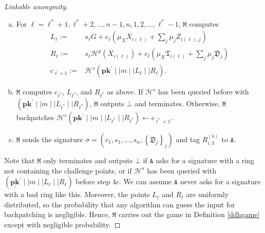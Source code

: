 \documentclass[draft]{llncs} %
\begin{document}
\begin{proof}[Linkable anonymity]
\begin{enumerate}[(a)]
\item For $\ell=\ell^*+1, \ell^*+2, \ldots, n-1, n, 1, 2, \ldots, \ell^*-1$, $\texttt{M}$ computes
\begin{align*}
L_\ell :=& s_\ell G + c_\ell\left(\mu_X X_{i(\ell)} + \sum_j \mu_j Z_{i(\ell),j}\right) \\
R_\ell :=& s_\ell\mathcal{H}^p(X_{i(\ell)}) + c_\ell\left(\mu_X \mathfrak{T}_{i(\ell)} + \sum_j \mu_j \mathfrak{D}_j\right)\\
c_{\ell+1} :=& \mathcal{H}^s\left(\underline{\textbf{pk}}^\prime \mid \mid m \mid \mid L_\ell \mid \mid R_\ell \right).
\end{align*}

\item $\texttt{M}$ computes $c_{\ell^*}$, $L_{\ell^*}$, and $R_{\ell^*}$ as above. If $\mathcal{H}^s$ has been queried before with $\left(\underline{\textbf{pk}}^\prime \mid \mid m \mid \mid L_{\ell^*} \mid \mid R_{\ell^*} \right)$, $\texttt{M}$ outputs $\bot$ and terminates. Otherwise, $\texttt{M}$ backpatches $\mathcal{H}^s\left(\underline{\textbf{pk}}^\prime \mid \mid m \mid \mid L_{\ell^*} \mid \mid R_{\ell^*} \right) \leftarrow c_{\ell^*+1}$.

\item $\texttt{M}$ sends the signature $\sigma = (c_1, s_1, \ldots, s_n, \left\{\mathfrak{D}_j\right\}_j)$ and tag $R_{i, 3}^{(b)}$ to $\texttt{A}$.
\end{enumerate}

Note that $\texttt{M}$ only terminates and outputs $\bot$ if $\texttt{A}$ asks for a signature with a ring not containing the challenge points, or if $\mathcal{H}^s$ has been queried with $\left(\underline{\textbf{pk}}^\prime \mid \mid m \mid \mid L_\ell \mid \mid R_\ell \right)$ before step $4c$. We can assume $\texttt{A}$ never asks for a signature with a bad ring like this. Moreover, the points $L_\ell$ and $R_\ell$ are uniformly distributed, so the probability that any algorithm can guess the input for backpatching is negligible. Hence, $\texttt{M}$ carries out the game in Definition \ref{ddhgame} except with negligible probability.


\end{proof}
\end{document}
